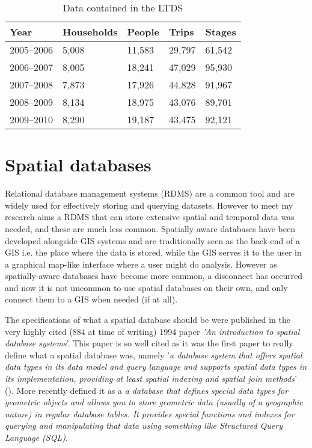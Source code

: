 \begin{table}[H]
    \begin{tabular}{ | p{2.2cm} | p{2.2cm} | p{2.2cm} | p{2.2cm} | p{2.2cm} |}
    \hline
    \textbf{Year} & \textbf{Households} & \textbf{People} & \textbf{Trips} & \textbf{Stages} \\ \hline
    2005--2006 & 5,008 & 11,583 & 29,797 & 61,542 \\ \hline
    2006--2007 & 8,005 & 18,241 & 47,029 & 95,930 \\ \hline
    2007--2008 & 7,873 & 17,926 & 44,828 & 91,967 \\ \hline
    2008--2009 & 8,134 & 18,975 & 43,076 & 89,701 \\ \hline
    2009--2010 & 8,290 & 19,187 & 43,475 & 92,121 \\ \hline
    \end{tabular}
    \caption{Data contained in the LTDS}
    \label{tab:ltds_data}
\end{table}


\section{Spatial databases}
\label{sec:spatialdatabases}

Relational database management systems (RDMS) are a common tool and are widely used for effectively storing and querying datasets. However to meet my research aims a RDMS that can store extensive spatial and temporal data was needed, and these are much less common. Spatially aware databases have been developed alongside GIS systems and are traditionally seen as the back-end of a GIS i.e. the place where the data is stored, while the GIS serves it to the user in a graphical map-like interface where a user might do analysis. However as spatially-aware databases have become more common, a disconnect has occurred and now it is not uncommon to use spatial databases on their own, and only connect them to a GIS when needed (if at all).

The specifications of what a spatial database should be were published in the very highly cited (884 at time of writing) 1994 paper \textit{'An introduction to spatial database systems}'. This paper is so well cited as it was the first paper to really define what a spatial database was, namely '\textit{a database system that offers spatial data types in its data model and query language and supports spatial data types in its implementation, providing at least spatial indexing and spatial join methods}' (\cite{Guting1994}). More recently \cite{ObeHsu201410} defined it as a \textit{a database that defines special data types for geometric objects and allows you to store geometric data (usually of a geographic nature) in regular database tables. It provides special functions and indexes for querying and manipulating that data using something like Structured Query Language (SQL)}.


